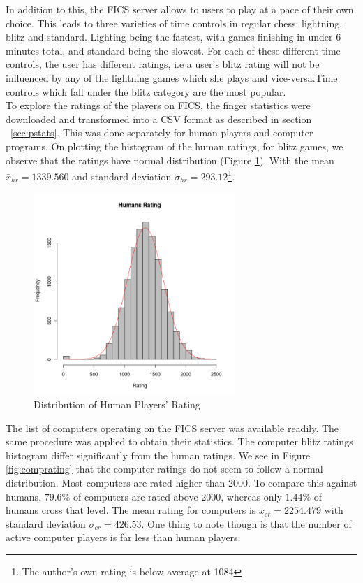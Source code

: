 \documentclass{article}
\begin{document}
In addition to this, the FICS server allows to users to play at a pace of their own choice. This leads to three varieties of time controls in regular chess: lightning, blitz and standard. Lighting being the fastest, with games finishing in under 6 minutes total, and standard being the slowest. For each of these different time controls, the user has different ratings, i.e a user's blitz rating will not be influenced by any of the lightning games which she plays and vice-versa.Time controls which fall under the blitz category are the most popular.\\

To explore the ratings of the players on FICS, the finger statistics were downloaded and transformed into a CSV format as described in section ~\ref{sec:pstats}. This was done separately for human players and computer programs. On plotting the histogram of the human ratings, for blitz games, we observe that the ratings have normal distribution (Figure \ref{fig:humanrating}). With the mean $\bar{x}_{hr} = 1339.560$ and standard deviation $\sigma_{hr} = 293.12$\footnote{The author's own rating is below average at 1084}.\\

\begin{figure} [tph]
\begin{center}
\includegraphics[width=3in]{humans_rating.png}
\end{center}
\caption{Distribution of Human Players' Rating}
\label{fig:humanrating}
\end{figure}


The list of computers operating on the FICS server was available readily. The same procedure was applied to obtain their statistics. The computer blitz ratings histogram differ significantly from the human ratings. We see in Figure \ref{fig:comprating} that the computer ratings do not seem to follow a normal distribution. Most computers are rated higher than 2000. To compare this against humans, $79.6\%$ of computers are rated above 2000, whereas only $1.44\%$ of humans cross that level. The mean rating for computers is $\bar{x}_{cr} = 2254.479$ with standard deviation $\sigma_{cr} = 426.53$. One thing to note though is that the number of active computer players is far less than human players.\\
\end{document}
